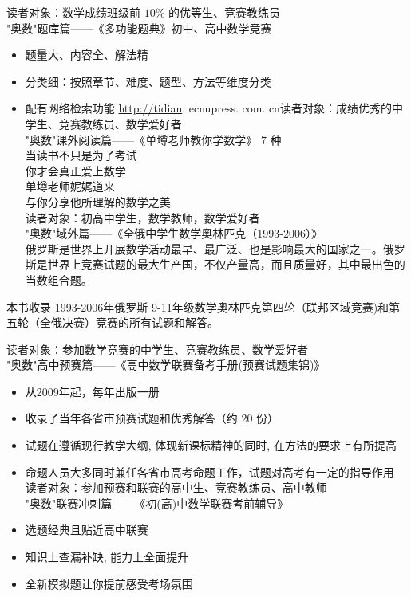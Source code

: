 \documentclass[10pt]{article}
\begin{document}
读者对象：数学成绩班级前 $10 \%$ 的优等生、竞赛教练员\\
"奥数"题库篇——《多功能题典》初中、高中数学竞赛

\begin{itemize}
  \item 题量大、内容全、解法精
  \item 分类细：按照章节、难度、题型、方法等维度分类
  \item 配有网络检索功能 \href{http://tidian}{http://tidian}. ecnupress. com. cn读者对象：成绩优秀的中学生、竞赛教练员、数学爱好者\\
"奥数"课外阅读篇——《单墫老师教你学数学》 7 种\\
当读书不只是为了考试\\
你才会真正爱上数学\\
单墫老师妮娓道来\\
与你分享他所理解的数学之美\\
读者对象：初高中学生，数学教师，数学爱好者\\
"奥数"域外篇——《全俄中学生数学奥林匹克（1993-2006）》\\
俄罗斯是世界上开展数学活动最早、最广泛、也是影响最大的国家之一。俄罗斯是世界上竞赛试题的最大生产国，不仅产量高，而且质量好，其中最出色的当数组合题。
\end{itemize}

本书收录 1993-2006年俄罗斯 9-11年级数学奥林匹克第四轮（联邦区域竞赛)和第五轮（全俄决赛）竞赛的所有试题和解答。

读者对象：参加数学竞赛的中学生、竞赛教练员、数学爱好者\\
"奥数"高中预赛篇——《高中数学联赛备考手册(预赛试题集锦)》

\begin{itemize}
  \item 从2009年起，每年出版一册
  \item 收录了当年各省市预赛试题和优秀解答（约 20 份）
  \item 试题在遵循现行教学大纲, 体现新课标精神的同时, 在方法的要求上有所提高
  \item 命题人员大多同时兼任各省市高考命题工作，试题对高考有一定的指导作用\\
读者对象：参加预赛和联赛的高中生、竞赛教练员、高中教师\\
"奥数"联赛冲刺篇——《初(高)中数学联赛考前辅导》
  \item 选题经典且贴近高中联赛
  \item 知识上查漏补缺, 能力上全面提升
  \item 全新模拟题让你提前感受考场氛围
\end{itemize}
\end{document}
